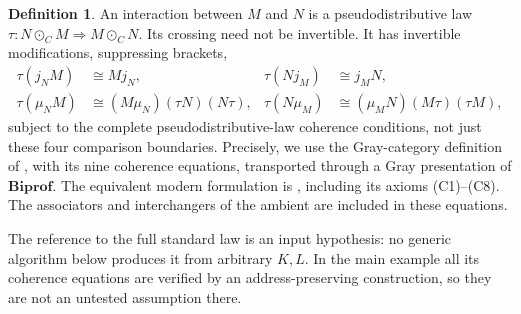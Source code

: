 \documentclass[11pt]{article}
\theoremstyle{definition}
\newtheorem{definition}[theorem]{Definition}
\newcommand{\Biprof}{\mathbf{Biprof}}
\begin{document}
\begin{definition}\label{def:law}
An interaction between $M$ and $N$ is a pseudodistributive law
$\tau:N\odot_C M\Rightarrow M\odot_C N$. Its crossing need not be
invertible. It has invertible modifications, suppressing brackets,
\begin{align*}
 \tau(j_NM)&\cong Mj_N,& \tau(Nj_M)&\cong j_MN,\\
 \tau(\mu_NM)&\cong(M\mu_N)(\tau N)(N\tau),&
 \tau(N\mu_M)&\cong(\mu_MN)(M\tau)(\tau M),
\end{align*}
subject to the complete pseudodistributive-law coherence conditions, not just
these four comparison boundaries. Precisely, we use the Gray-category
definition of \cite[Section 4]{Marmolejo}, with its nine coherence equations,
transported through a Gray presentation of $\Biprof$. The equivalent modern
formulation is \cite[Definition 4.1]{GambinoLobbia}, including its axioms
\textup{(C1)--(C8)}. The associators and interchangers of the ambient are
included in these equations.
\end{definition}

The reference to the full standard law is an input hypothesis: no generic
algorithm below produces it from arbitrary $K,L$. In the main example all
its coherence equations are verified by an address-preserving construction,
so they are not an untested assumption there.
\end{document}

